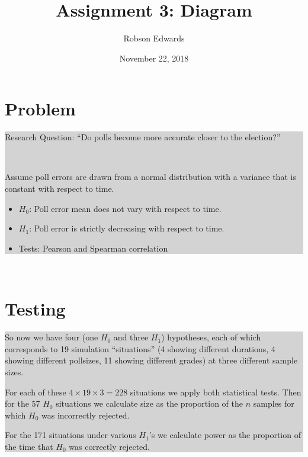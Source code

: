 \documentclass[10pt, oneside]{article}
\title{Assignment 3: Diagram}
\author{Robson Edwards}
\date{November 22, 2018}		%
\newcommand \diabox[2]{\colorbox{lightgray}{\parbox{#1}{#2}}}
\begin{document}
\maketitle

\begin{minipage}[t]{8cm}

\begin{minipage}[t]{8cm}

\section*{Problem}
\diabox{8cm}{
Research Question: ``Do polls become more accurate closer to the election?''

~

Assume poll errors are drawn from a normal distribution with a variance that is constant with respect to time.

\begin{itemize}
\item $H_0$: Poll error mean does not vary with respect to time.

\item $H_1$: Poll error is strictly decreasing with respect to time. 

\item Tests: Pearson and Spearman correlation
\end{itemize}

}
\end{minipage}

\begin{minipage}[t]{8cm}
~

\section*{Testing}
\diabox{8cm}{
So now we have four (one $H_0$ and three $H_1$) hypotheses, each of which corresponds to 19 simulation ``situations'' (4 showing different durations, 4 showing different pollsizes, 11 showing different grades) at three different sample sizes. 

For each of these $4 \times 19 \times 3 = 228$ situations we apply both statistical tests. Then for the 57 $H_0$ situations we calculate size as the proportion of the $n$ samples for which $H_0$ was incorrectly rejected.

For the 171 situations under various $H_1$'s we calculate power as the proportion of the time that $H_0$ was correctly rejected. 
}

\end{minipage}

\end{minipage}
\end{document}
